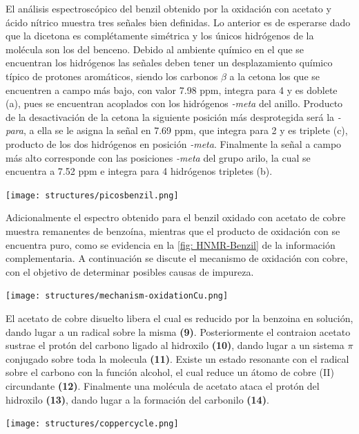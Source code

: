 \documentclass[fleqn,10pt]{SelfArx}
\begin{document}
El an\'alisis espectrosc\'opico del benzil obtenido por la oxidaci\'on con acetato y \'acido n\'itrico muestra tres se\~nales bien definidas. Lo anterior es de esperarse dado que la dicetona es compl\'etamente sim\'etrica y los \'unicos hidr\'ogenos de la mol\'ecula son los del benceno. Debido al ambiente qu\'imico en el que se encuentran los hidr\'ogenos las señales deben tener un desplazamiento qu\'imico t\'ipico de protones arom\'aticos, siendo los carbonos $\beta$ a la cetona los que se encuentren a campo m\'as bajo, con valor 7.98 ppm, integra para 4 y es doblete (a), pues se encuentran acoplados con los hidr\'ogenos \textit{-meta} del anillo. Producto de la desactivaci\'on de la cetona la siguiente posici\'on m\'as desprotegida ser\'a la \textit{-para}, a ella se le asigna la se\~nal en 7.69 ppm, que integra para 2 y es triplete (c), producto de los dos hidr\'ogenos en posici\'on \textit{-meta}. Finalmente la se\~nal a campo m\'as alto corresponde con las posiciones \textit{-meta} del grupo arilo, la cual se encuentra a 7.52 ppm e integra para 4 hidr\'ogenos tripletes (b).
\begin{scheme}[h]
	\centering
	\caption{Asignaci\'on de protones para el benzil.}
	\texttt{[image: structures/picosbenzil.png]}
\end{scheme}

Adicionalmente el espectro obtenido para el benzil oxidado con acetato de cobre muestra remanentes de benzo\'ina, mientras que el producto de oxidaci\'on con  se encuentra puro, como se evidencia en la \autoref{fig: HNMR-Benzil} de la informaci\'on complementaria. A continuaci\'on se discute el mecanismo de oxidaci\'on con cobre, con el objetivo de determinar posibles causas de impureza. 
\begin{scheme}[h]
	\centering
	\caption{Mecanismo de oxidaci\'on de la benzo\'ina por acetato de cobre \cite{wigal2000}.}
	\texttt{[image: structures/mechanism-oxidationCu.png]}
\end{scheme}

\pagebreak
El acetato de cobre disuelto libera  el cual es reducido por la benzoina en soluci\'on, dando lugar a un radical sobre la misma \textbf{(9)}. Posteriormente el contraion acetato sustrae el prot\'on del carbono ligado al hidroxilo \textbf{(10)}, dando lugar a un sistema $\pi$ conjugado sobre toda la molecula \textbf{(11)}. Existe un estado resonante con el radical sobre el carbono con la funci\'on alcohol, el cual reduce un \'atomo de cobre (II) circundante \textbf{(12)}. Finalmente una mol\'ecula de acetato ataca el prot\'on del hidroxilo \textbf{(13)}, dando lugar a la formaci\'on del carbonilo \textbf{(14)}.
\begin{scheme}[h]
	\centering
	\caption{Funci\'on catal\'itica del cobre \cite{wigal2000}.}
	\texttt{[image: structures/coppercycle.png]}
\end{scheme}
\end{document}
